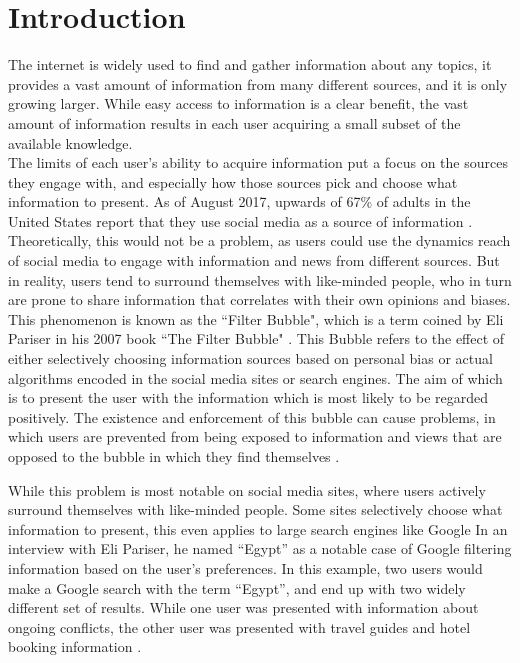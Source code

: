 \chapter{Introduction}
The internet is widely used to find and gather information about any topics, it
provides a vast amount of information from many different sources, and it is
only growing larger.
While easy access to information is a clear benefit, the vast amount of
information results in each user acquiring a small subset of the available
knowledge.\\
The limits of each user's ability to acquire information put a focus on the
sources they engage with, and especially how those sources pick and choose what
information to present.
As of August 2017, upwards of 67\% of adults in the United States report that
they use social media as a source of information \citep{journalism2017}.
Theoretically, this would not be a problem, as users could use the dynamics
reach of social media to engage with information and news from different sources.
But in reality, users tend to surround themselves with like-minded people, who
in turn are prone to share information that correlates with their own opinions
and biases.\\

This phenomenon is known as the ``Filter Bubble", which is a term coined by Eli
Pariser in his 2007 book ``The Filter Bubble" \citep{pariser2011filter}.
This Bubble refers to the effect of either selectively choosing information
sources based on personal bias or actual algorithms encoded in the social media
sites or search engines.
The aim of which is to present the user with the information which is most
likely to be regarded positively.
The existence and enforcement of this bubble can cause problems, in which users
are prevented from being exposed to information and views that are opposed to
the bubble in which they find themselves
\citep[p.59-73]{pariser2011filter}.\nl

While this problem is most notable on social media sites, where users actively
surround themselves with like-minded people. Some sites selectively choose what
information to present, this even applies to large search engines like Google
\citep{filterBubbleDef} \citep{Personality} In an interview with Eli Pariser, he
named ``Egypt'' as a notable case of Google filtering information based on the
user's preferences. In this example, two users would make a Google search with
the term ``Egypt'', and end up with two widely different set of results.
While one user was presented with information about ongoing conflicts, the other
user was presented with travel guides and hotel booking information
\citep{nusSduSearch}.